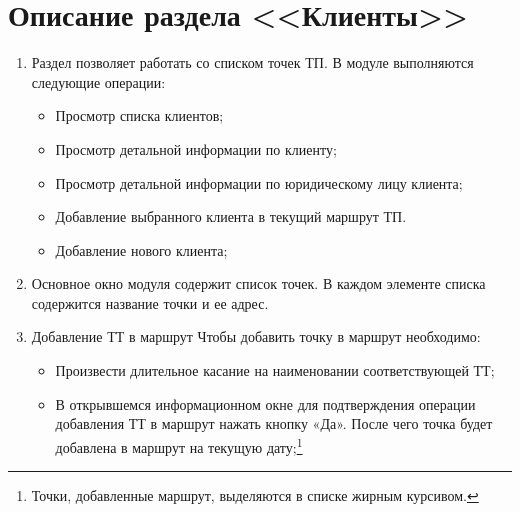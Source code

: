 \section{Описание раздела <<Клиенты>>}\label{sec:sec14_1}
\begin{enumerate}[\thesection .1]
\item Раздел позволяет работать со списком точек ТП.
В модуле выполняются следующие операции:
\begin{itemize}
	\item Просмотр списка клиентов;
	\item Просмотр детальной информации по клиенту;
	\item Просмотр детальной информации по юридическому лицу клиента;
	\item Добавление выбранного клиента в текущий маршрут ТП.
	\item Добавление нового клиента;
\end{itemize}
\item Основное окно модуля содержит список точек. В каждом элементе списка содержится название точки и ее адрес. 
\item Добавление ТТ в маршрут
Чтобы добавить точку в маршрут необходимо:
\begin{itemize}
	\item Произвести длительное касание на наименовании соответствующей ТТ;
	\item В открывшемся информационном окне для подтверждения операции добавления ТТ в маршрут нажать кнопку «Да». После чего точка будет добавлена в маршрут на текущую дату;\footnote{Точки, добавленные маршрут, выделяются в списке жирным курсивом.}
\end{itemize}


\end{enumerate}
